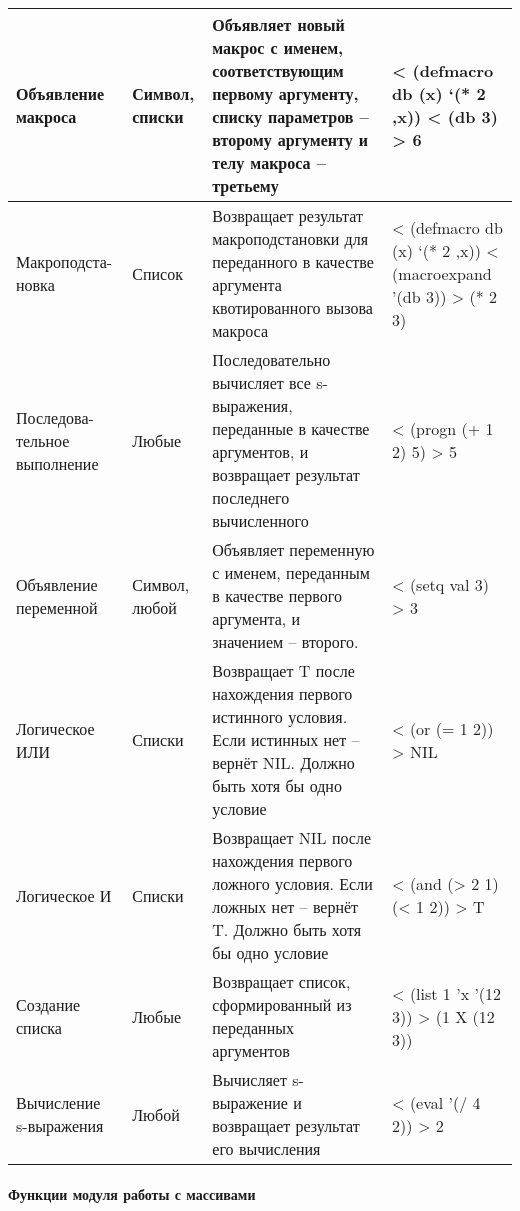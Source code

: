 \begin{xltabular}{\textwidth}{|p{3.6cm}|p{1.8cm}|p{6cm}|X|}
	Объявление макроса & Символ, списки & Объявляет новый макрос с именем, соответствующим первому аргументу, списку параметров -- второму аргументу и телу макроса -- третьему & < (defmacro db (x) `(* 2 ,x)) \linebreak < (db 3) \linebreak > 6 \\ \hline 
	Макроподста-\linebreak новка & Список & Возвращает результат макроподстановки для переданного в качестве аргумента квотированного вызова макроса & < (defmacro db (x) `(* 2 ,x)) \linebreak < (macroexpand '(db 3)) \linebreak > (* 2 3) \\ \hline 
	Последова-\linebreak тельное выполнение & Любые & Последовательно вычисляет все s-выражения, переданные в качестве аргументов, и возвращает результат последнего вычисленного & < (progn  (+ 1 2) 5) \linebreak > 5 \\ \hline 
	Объявление переменной & Символ, любой & Объявляет переменную с именем, переданным в качестве первого аргумента, и значением -- второго. & < (setq val 3) \linebreak > 3 \\ \hline 
	Логическое ИЛИ & Списки & Возвращает T после нахождения первого истинного условия. Если истинных нет -- вернёт NIL. Должно быть хотя бы одно условие & < (or (= 1 2)) \linebreak > NIL \\ \hline 
	Логическое И & Списки & Возвращает NIL после нахождения первого ложного условия. Если ложных нет -- вернёт T. Должно быть хотя бы одно условие & < (and (> 2 1) (< 1 2)) \linebreak > T \\ \hline 
	Создание списка & Любые & Возвращает список, сформированный из переданных аргументов & < (list 1 'x '(12 3)) \linebreak > (1 X (12 3)) \\ \hline 
	Вычисление s-выражения & Любой & Вычисляет s-выражение и возвращает результат его вычисления & < (eval '(/ 4 2)) \linebreak > 2 \\ \hline 
\end{xltabular}

\paragraph{Функции модуля работы с массивами}

